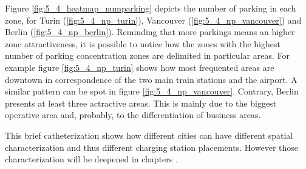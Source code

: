 Figure \ref{fig:5_4_heatmap_numparking} depicts the number of parking in each zone, for Turin (\ref{fig:5_4_np_turin}), Vancouver (\ref{fig:5_4_np_vancouver}) and Berlin (\ref{fig:5_4_np_berlin}). Reminding that more parkings means an higher zone attractiveness,
 it is possible to notice how the zones with the highest number of parking concentration zones are delimited in particular areas. For example figure \ref{fig:5_4_np_turin} shows how most frequented areas are downtown in correspondence of the two main train stations and the airport. A similar pattern can be spot in figure \ref{fig:5_4_np_vancouver}. Contrary, Berlin presents at least three actractive areas. This is mainly due to the biggest operative area and, probably, to the differentiation of business areas.

This brief catheterization shows how  different cities can have different spatial characterization and thus different charging station placements. However those characterization will be deepened in chapters .
